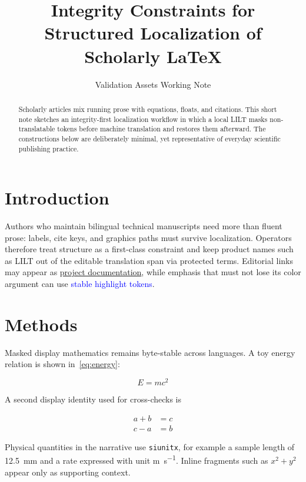 \documentclass[11pt]{article}
\title{Integrity Constraints for Structured Localization of Scholarly \LaTeX{}}
\author{Validation Assets Working Note}
\date{}
\newcommand{\toolname}{LILT}
\begin{document}
\maketitle

\begin{abstract}
Scholarly articles mix running prose with equations, floats, and citations.
This short note sketches an integrity-first localization workflow in which a
local \toolname{} masks non-translatable tokens before machine translation and
restores them afterward. The constructions below are deliberately minimal, yet
representative of everyday scientific publishing practice.
\end{abstract}

\section{Introduction}
\label{sec:intro}

Authors who maintain bilingual technical manuscripts need more than fluent
prose: labels, cite keys, and graphics paths must survive localization.
Operators therefore treat structure as a first-class constraint and keep product
names such as \toolname{} out of the editable translation span via protected
terms. Editorial links may appear as
\href{https://www.latex-project.org/}{project documentation}, while emphasis
that must not lose its color argument can use
\textcolor{blue}{stable highlight tokens}.

\section{Methods}
\label{sec:methods}

Masked display mathematics remains byte-stable across languages. A toy energy
relation is shown in~\cref{eq:energy}:

\begin{equation}
\label{eq:energy}
E = mc^{2}
\end{equation}

A second display identity used for cross-checks is

\begin{align}
\label{eq:sum}
a + b &= c \\
c - a &= b
\end{align}

Physical quantities in the narrative use \texttt{siunitx}, for example a sample
length of \SI{12.5}{\milli\metre} and a rate expressed with unit
\si{\metre\per\second}. Inline fragments such as $x^{2}+y^{2}$ appear only as
supporting context.
\end{document}
